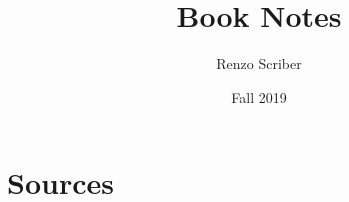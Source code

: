 \documentclass[a4paper]{article}
\title{Book Notes}
\author{Renzo Scriber}
\date{Fall 2019}
\begin{document}
\maketitle

\section*{Sources}
\end{document}
